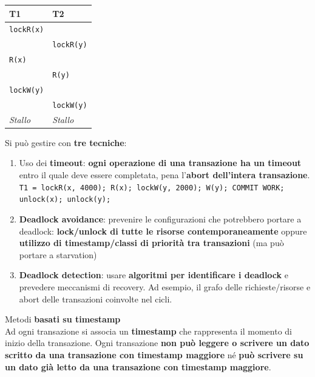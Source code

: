 \documentclass[10pt]{book}
\begin{document}
\begin{list}{}{}
\begin{list}{}{}
\begin{list}{}{}
\begin{multicols}{2}
			\begin{tabular}{l | l}
				T1 & T2 \\
				\hline
				\texttt{lockR(x)} & \\
				& \texttt{lockR(y)} \\
				\texttt{R(x)} & \\
				& \texttt{R(y)} \\
				\texttt{lockW(y)} & \\
				& \texttt{lockW(y)} \\
				\textit{Stallo} & \textit{Stallo}
			\end{tabular}
			\end{multicols}
			Si può gestire con \textbf{tre tecniche}:
			\begin{enumerate}
				\item Uso dei \textbf{timeout}: \textbf{ogni operazione di una transazione ha un timeout} entro il quale deve essere completata, pena l'\textbf{abort dell'intera transazione}.\\
\texttt{T1 = lockR(x, 4000); R(x); lockW(y, 2000); W(y); COMMIT WORK; unlock(x); unlock(y);}				
				\item \textbf{Deadlock avoidance}: prevenire le configurazioni che potrebbero portare a deadlock: \textbf{lock/unlock di tutte le risorse contemporaneamente} oppure \textbf{utilizzo di timestamp/classi di priorità tra transazioni} (ma può portare a starvation)
				\item \textbf{Deadlock detection}: usare \textbf{algoritmi per identificare i deadlock} e prevedere meccanismi di recovery. Ad esempio, il grafo delle richieste/risorse e abort delle transazioni coinvolte nel cicli.
			\end{enumerate}
		\end{list}
		\item Metodi \textbf{basati su timestamp}\\
		Ad ogni transazione si associa un \textbf{timestamp} che rappresenta il momento di inizio della transazione. Ogni transazione \textbf{non può leggere o scrivere un dato scritto da una transazione con timestamp maggiore} né \textbf{può scrivere su un dato già letto da una transazione con timestamp maggiore}.
	\end{list}
\end{list}
\pagebreak
\end{document}
